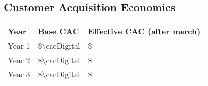 \subsection{Customer Acquisition Economics}
\begin{table}[H]
\centering
\begin{tabularx}{\linewidth}{l Y Y}
\toprule
Year & Base CAC & Effective CAC (after merch) \\\midrule
Year 1 & \$\num{\cacDigital} & \$\numfpeval{\cacDigital - \merchOffsetSubsCalc} \\
Year 2 & \$\num{\cacDigital} & \$\numfpeval{\cacDigital - \merchOffsetSubsCalc} \\
Year 3 & \$\num{\cacDigital} & \$\numfpeval{\cacDigital - \merchOffsetSubsCalc} \\
\bottomrule
\end{tabularx}
\end{table}
